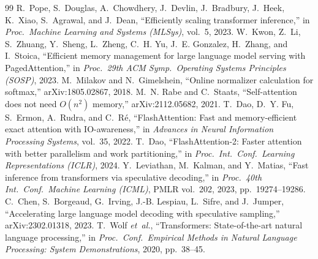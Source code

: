 \documentclass[conference]{IEEEtran}
\begin{document}
\begin{thebibliography}{99}
 R.~Pope, S.~Douglas, A.~Chowdhery, J.~Devlin, J.~Bradbury, J.~Heek, K.~Xiao, S.~Agrawal, and J.~Dean, ``Efficiently scaling transformer inference,'' in \emph{Proc.\ Machine Learning and Systems (MLSys)}, vol.~5, 2023.
 W.~Kwon, Z.~Li, S.~Zhuang, Y.~Sheng, L.~Zheng, C.~H. Yu, J.~E. Gonzalez, H.~Zhang, and I.~Stoica, ``Efficient memory management for large language model serving with PagedAttention,'' in \emph{Proc.\ 29th ACM Symp.\ Operating Systems Principles (SOSP)}, 2023.
 M.~Milakov and N.~Gimelshein, ``Online normalizer calculation for softmax,'' arXiv:1805.02867, 2018.
 M.~N. Rabe and C.~Staats, ``Self-attention does not need $O(n^2)$ memory,'' arXiv:2112.05682, 2021.
 T.~Dao, D.~Y. Fu, S.~Ermon, A.~Rudra, and C.~R{\'e}, ``FlashAttention: Fast and memory-efficient exact attention with IO-awareness,'' in \emph{Advances in Neural Information Processing Systems}, vol.~35, 2022.
 T.~Dao, ``FlashAttention-2: Faster attention with better parallelism and work partitioning,'' in \emph{Proc.\ Int.\ Conf.\ Learning Representations (ICLR)}, 2024.
 Y.~Leviathan, M.~Kalman, and Y.~Matias, ``Fast inference from transformers via speculative decoding,'' in \emph{Proc.\ 40th Int.\ Conf.\ Machine Learning (ICML)}, PMLR vol.~202, 2023, pp.~19274--19286.
 C.~Chen, S.~Borgeaud, G.~Irving, J.-B. Lespiau, L.~Sifre, and J.~Jumper, ``Accelerating large language model decoding with speculative sampling,'' arXiv:2302.01318, 2023.
 T.~Wolf \emph{et~al.}, ``Transformers: State-of-the-art natural language processing,'' in \emph{Proc.\ Conf.\ Empirical Methods in Natural Language Processing: System Demonstrations}, 2020, pp.~38--45.
\end{thebibliography}

\appendices
\end{document}
